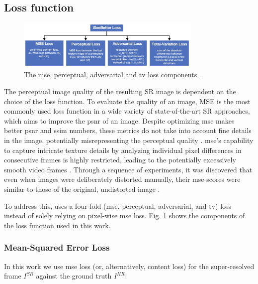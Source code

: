 \documentclass[conference]{IEEEtran}
\begin{document}
\subsection{Loss function\label{sec:loss_function}}

\begin{figure}[t]
	\centering
    \centerline{\includegraphics[width=8.9cm]{loss}}
	\caption{The \acrshort{mse}, perceptual, adversarial and \acrshort{tv} loss components \cite{iSeeBetter_2020}.}
	\label{fig:loss}
\end{figure}

The perceptual image quality of the resulting SR image is dependent on the choice of the loss function. To evaluate the quality of an image, MSE is the most commonly used loss function in a wide variety of state-of-the-art SR approaches, which aims to improve the \acrshort{psnr} of an image. Despite optimizing \acrshort{mse} makes better \acrshort{psnr} and \acrshort{ssim} numbers, these metrics do not take into account fine details in the image, potentially misrepresenting the perceptual quality \cite{iSeeBetter_2020}. \acrshort{mse}'s capability to capture intricate texture details by analyzing individual pixel differences in consecutive frames is highly restricted, leading to the potentially excessively smooth video frames \cite{fast_video_super_reso_ann_2012}. Through a sequence of experiments, it was discovered that even when images were deliberately distorted manually, their \acrshort{mse} scores were similar to those of the original, undistorted image \cite{universal_image_quality_index_2002}.

To address this, \cite{iSeeBetter_2020} uses a four-fold (\acrlong{mse}, perceptual, adversarial, and \acrlong{tv}) loss instead of solely relying on pixel-wise \acrshort{mse} loss. Fig. \ref{fig:loss} shows the components of the loss function used in this work.

\subsubsection{Mean-Squared Error Loss}

In this work we use \acrshort{mse} loss (or, alternatively, content loss) for the super-resolved frame $I^{SR}$ against the ground truth $I^{HR}$:
\end{document}
